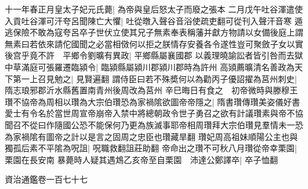 十一年春正月皇太子妃元氏薨|{
	為帝與皇后怒太子而廢之張本}
二月戊午吐谷渾遣使入貢吐谷渾可汗夸呂聞陳亡大懼|{
	吐從暾入聲谷音浴使疏吏翻可從刊入聲汗音寒}
遁逃保險不敢為寇夸呂卒子世伏立使其兄子無素奉表稱藩并獻方物請以女備後庭上謂無素曰若依來請佗國聞之必當相傚何以拒之朕情存安養各令遂性豈可聚斂子女以實後宫乎竟不許　平鄉令劉曠有異政|{
	平鄉縣屬襄國郡}
以義理曉諭訟者皆引咎而去獄中草滿庭可張羅遷臨潁令|{
	臨潁縣屬潁川郡潁川郡時為許州}
高熲薦曠清名善政為天下第一上召見勉之|{
	見賢遍翻}
謂侍臣曰若不殊奬何以為勸丙子優詔擢為莒州刺史|{
	隋志琅邪郡沂水縣舊置南青州後周改為莒州}
辛巳晦日有食之　初帝微時與滕穆王瓚不協帝為周相以瓚為大宗伯瓚恐為家禍隂欲圖帝帝隱之|{
	隋書瓚傳瓚美姿儀好書愛士有令名於當世周宣帝崩帝入禁中將總朝政令世子勇召之欲有計議瓚素與帝不協聞召不從曰作隨國公恐不能保何乃更為族滅事耶帝相周瓚拜大宗伯瓚見羣情未一恐為家禍隂有圖帝之計以是言之固周之忠臣也瓚藏旱翻}
瓚妃周高祖妹順陽公主也與獨孤后素不平隂為呪詛|{
	呪職救翻詛莊助翻}
帝命出之瓚不可秋八月瓚從帝幸栗園|{
	栗園在長安南}
暴薨時人疑其遇鴆乙亥帝至自栗園　沛達公鄭譯卒|{
	卒子恤翻}


資治通鑑卷一百七十七

